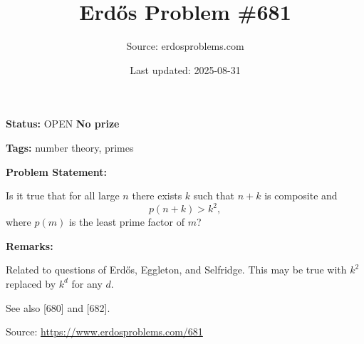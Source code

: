 \documentclass{article}
\title{Erd\H{o}s Problem \#681}
\date{Last updated: 2025-08-31}
\author{Source: erdosproblems.com}
\begin{document}
\maketitle

\noindent\textbf{Status:} OPEN \quad \textbf{No prize}

\noindent\textbf{Tags:} number theory, primes

\medskip
\noindent\textbf{Problem Statement:}

Is it true that for all large $n$ there exists $k$ such that $n+k$ is composite and\[p(n+k)>k^2,\]where $p(m)$ is the least prime factor of $m$?

\bigskip
\noindent\textbf{Remarks:}

Related to questions of Erd\H{o}s, Eggleton, and Selfridge. This may be true with $k^2$ replaced by $k^d$ for any $d$.

See also [680] and [682].

\bigskip
\noindent\small{Source: \url{https://www.erdosproblems.com/681}}
\end{document}

